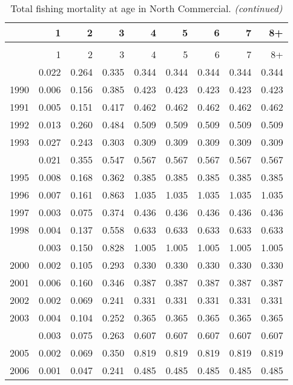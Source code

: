 \documentclass[
]{article}
\begin{document}
\begin{longtable}[t]{lrrrrrrrr}
\caption{\label{tab:North_Commercial-fleet-FAA-table}Total fishing mortality at age in North Commercial.}\\
\toprule
  & 1 & 2 & 3 & 4 & 5 & 6 & 7 & 8+\\
\midrule
\endfirsthead
\caption[]{Total fishing mortality at age in North Commercial. \textit{(continued)}}\\
\toprule
  & 1 & 2 & 3 & 4 & 5 & 6 & 7 & 8+\\
\midrule
\endhead

\endfoot
\bottomrule
\endlastfoot
1989 & 0.022 & 0.264 & 0.335 & 0.344 & 0.344 & 0.344 & 0.344 & 0.344\\
1990 & 0.006 & 0.156 & 0.385 & 0.423 & 0.423 & 0.423 & 0.423 & 0.423\\
1991 & 0.005 & 0.151 & 0.417 & 0.462 & 0.462 & 0.462 & 0.462 & 0.462\\
1992 & 0.013 & 0.260 & 0.484 & 0.509 & 0.509 & 0.509 & 0.509 & 0.509\\
1993 & 0.027 & 0.243 & 0.303 & 0.309 & 0.309 & 0.309 & 0.309 & 0.309\\
\addlinespace
1994 & 0.021 & 0.355 & 0.547 & 0.567 & 0.567 & 0.567 & 0.567 & 0.567\\
1995 & 0.008 & 0.168 & 0.362 & 0.385 & 0.385 & 0.385 & 0.385 & 0.385\\
1996 & 0.007 & 0.161 & 0.863 & 1.035 & 1.035 & 1.035 & 1.035 & 1.035\\
1997 & 0.003 & 0.075 & 0.374 & 0.436 & 0.436 & 0.436 & 0.436 & 0.436\\
1998 & 0.004 & 0.137 & 0.558 & 0.633 & 0.633 & 0.633 & 0.633 & 0.633\\
\addlinespace
1999 & 0.003 & 0.150 & 0.828 & 1.005 & 1.005 & 1.005 & 1.005 & 1.005\\
2000 & 0.002 & 0.105 & 0.293 & 0.330 & 0.330 & 0.330 & 0.330 & 0.330\\
2001 & 0.006 & 0.160 & 0.346 & 0.387 & 0.387 & 0.387 & 0.387 & 0.387\\
2002 & 0.002 & 0.069 & 0.241 & 0.331 & 0.331 & 0.331 & 0.331 & 0.331\\
2003 & 0.004 & 0.104 & 0.252 & 0.365 & 0.365 & 0.365 & 0.365 & 0.365\\
\addlinespace
2004 & 0.003 & 0.075 & 0.263 & 0.607 & 0.607 & 0.607 & 0.607 & 0.607\\
2005 & 0.002 & 0.069 & 0.350 & 0.819 & 0.819 & 0.819 & 0.819 & 0.819\\
2006 & 0.001 & 0.047 & 0.241 & 0.485 & 0.485 & 0.485 & 0.485 & 0.485\\

\end{longtable}
\end{document}
